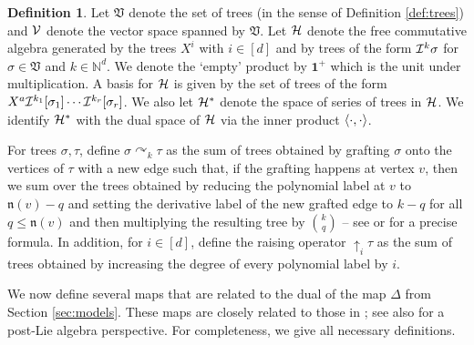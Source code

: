 \documentclass[11pt,a4paper]{article}
\numberwithin{equation}{section}
\theoremstyle{definition}
\newtheorem{definition}[theorem]{Definition}
\theoremstyle{remark}
\def\N{{\mathbb N}}
\newcommand{\bone}{\mathbf{1}}
\newcommand{\mfn}{\mathfrak{n}}
\newcommand{\mfV}{\mathfrak{V}}
\begin{document}
\begin{definition}
Let $\mfV$ denote the set of trees (in the sense of Definition \ref{def:trees}) and $\mathcal{V}$ denote the vector space spanned by $\mfV$.
Let $\mathcal{H}$ denote the free commutative algebra generated by the trees $X^i$ with $i\in[d]$ and by trees of the form $\mathcal{I}^{k}\sigma$ for $\sigma \in\mfV$ and $k\in\N^d$.
We denote the `empty' product by $\bone^+$ which is the unit under multiplication.
A basis for $\mathcal{H}$ is given by the set of trees of the form $X^a\mathcal{I}^{k_1}[\sigma_1]\cdots\mathcal{I}^{k_r}[\sigma_r]$.
We also let $\mathcal{H}^*$ denote the space of series of trees in $\mathcal{H}$.
We identify $\mathcal{H}^*$ with the dual space of $\mathcal{H}$ via the inner product $\scal{\cdot,\cdot}$.
\end{definition}

For trees $\sigma,\tau$, define $\sigma \curvearrowright_k \tau$ as the sum of trees obtained by grafting $\sigma$ onto the vertices of $\tau$ with a new edge such that, if the grafting happens at vertex $v$, then we sum over the trees obtained by reducing the polynomial label at $v$ to $\mfn(v)-q$ and setting the derivative label of the new grafted edge to $k-q$ for all $q \leq \mfn(v)$ and then multiplying the resulting tree by $\binom{k}{q}$ -- see \cite[Remark~4.12]{BCCH21} or \cite[Eq.~(4.26)]{ESI_lectures} for a precise formula.
In addition, for $i\in[d]$, define the raising operator $\uparrow_i \tau$ as the sum of trees obtained by increasing the degree of every polynomial label by $i$.

We now define several maps that are related to the dual of the map $\Delta$ from Section \ref{sec:models}. These maps are closely related to those in \cite{Bruned_Manchon_23_deform}; see also \cite{Bruned_Katsetsiadis_23_post_Lie} for a post-Lie algebra perspective.
For completeness, we give all necessary definitions.
\end{document}
